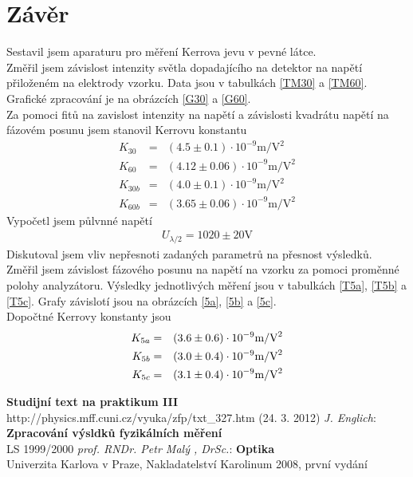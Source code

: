 \documentclass[a4paper,12pt]{article}
\begin{document}
\section{Závěr}
Sestavil jsem aparaturu pro měření Kerrova jevu v pevné látce. \\
Změřil jsem závislost intenzity světla dopadajícího na detektor na napětí přiloženém na elektrody vzorku. Data jsou v tabulkách \ref{TM30} a \ref{TM60}. Grafické zpracování 
je na obrázcích \ref{G30} a \ref{G60}. \\
Za pomoci fitů na zavislost intenzity na napětí a závislosti kvadrátu napětí na fázovém posunu jsem stanovil Kerrovu konstantu
\begin{eqnarray}
K_{30}&=&(4.5\pm0.1)\cdot 10^{-9} \mbox{m}/\mbox{V}^2\\
K_{60}&=&(4.12\pm0.06)\cdot 10^{-9} \mbox{m}/\mbox{V}^2 \\
K_{30b}&=&(4.0\pm0.1)\cdot 10^{-9}\mbox{m}/\mbox{V}^2 \\
K_{60b}&=&(3.65\pm0.06)\cdot 10^{-9}\mbox{m}/\mbox{V}^2 
\end{eqnarray}
Vypočetl jsem půlvnné napětí
\begin{eqnarray}
U_{\lambda/2}=1020\pm 20 \mbox{V}
\end{eqnarray}
Diskutoval jsem vliv nepřesnoti zadaných parametrů na přesnost výsledků. \\
Změřil jsem závislost fázového posunu na napětí na vzorku za pomoci proměnné polohy analyzátoru. Výsledky jednotlivých měření jsou v tabulkách \ref{T5a}, \ref{T5b} a \ref{T5c}. 
Grafy závislotí jsou na obrázcích \ref{5a}, \ref{5b} a \ref{5c}. \\
Dopočtné Kerrovy konstanty jsou
\begin{eqnarray}
K_{5a}&=&(3.6\pm 0.6) \cdot 10^{-9} \mbox{m}/\mbox{V}^2 \\
K_{5b}&=&(3.0\pm0.4) \cdot 10^{-9} \mbox{m}/\mbox{V}^2 \\
K_{5c}&=&(3.1\pm0.4) \cdot 10^{-9} \mbox{m}/\mbox{V}^2
\end{eqnarray}



\begin{thebibliography}{5}
	 \textbf{Studijní text na praktikum III} \\http://physics.mff.cuni.cz/vyuka/zfp/txt\_327.htm (24. 3. 2012)
     \emph{J. Englich}: \textbf{Zpracování výsldků fyzikálních měření} \\ LS 1999/2000
     \emph{prof. RNDr. Petr Malý , DrSc.}: \textbf{Optika}\\Univerzita Karlova v Praze, Nakladatelství Karolinum 2008, první vydání
\end{thebibliography}
\end{document}
